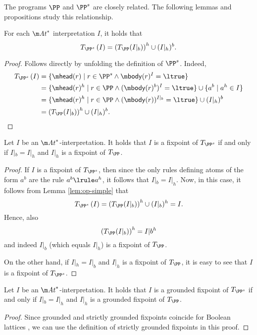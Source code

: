 {The programs $\PP$ and $\PP^s$ are closely related. The following lemmas and propositions study this relationship. 

\begin{lemma}
  \label{lem:op-simple}
  For each $\atoms^*$ interpretation  $I$, it holds that 
  \[ T_{\PP^s}\left(I\right) = \left(T_\PP(I|_b)\right)^h\cup (I|_h)^b.\]
\end{lemma}
\begin{proof}
Follows directly by unfolding the definition of $\PP^s$. Indeed,
  \begin{align*}
    T_{\PP^s}\left(I\right) &= \{\head(r)\mid r\in \PP^s\land \body(r)^I=\ltrue\} \\
    &= \{\head(r)^h\mid r\in \PP \land (\body(r)^b)^{I}=\ltrue\}\cup\{a^b\mid a^h\in I\} \\
    &= \{\head(r)^h\mid r\in \PP \land (\body(r))^{I|_b}=\ltrue\}\cup (I|_h)^b \\
    &= \left(T_\PP(I|_b)\right)^h\cup (I|_h)^b.\qedhere
  \end{align*}
\end{proof}

\begin{proposition}
  \label{prop:simple-fp}
  Let $I$ be an $\atoms^*$-interpretation. It holds that $I$ is a fixpoint of  $T_{\PP^s}$ if and only if $I|_b=I|_h$ and $I|_h$ is a fixpoint of $T_\PP$.
\end{proposition}
\begin{proof}
If $I$ is a fixpoint of $T_{\PP^s}$, then since the only rules defining atoms of the form $a^b$ are the rule $a^b\lrule a^h$, it follows that  $I|_b=I|_h$. 
Now, in this case, it follows from Lemma \ref{lem:op-simple} that 
\[ T_{\PP^s}\left(I\right) = \left(T_\PP(I|_b)\right)^h\cup (I|_b)^h = I .\]
Hence, also 
\[\left(T_\PP(I|_b)\right)^h=I|b^h\]
and indeed $I|_b$ (which equals $I|_h$) is a fixpoint of $T_\PP$. 

On the other hand, if $I|_h=I|_b$ and $I|_h$ is a fixpoint of $T_\PP$, it is easy to see that $I$ is a fixpoint of $T_{\PP^s}$.
% 
% 
\end{proof}


\begin{proposition}
  \label{prop:simple-gf}
    Let $I$ be an $\atoms^*$-interpretation. It holds that $I$ is a grounded fixpoint of  $T_{\PP^s}$ if and only if $I|_b=I|_h$ and $I|_h$ is a grounded fixpoint of $T_\PP$.
\end{proposition}
\begin{proof}
  Since grounded and strictly grounded fixpoints coincide for Boolean lattices , we can use the definition  of strictly grounded fixpoints in this proof.


\end{proof}}
